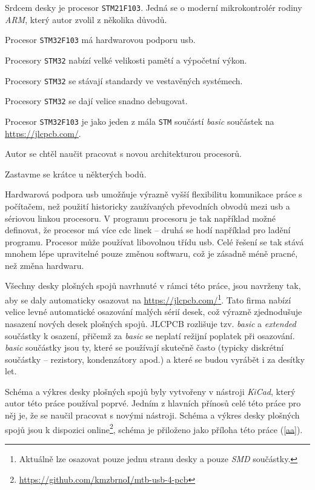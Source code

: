 Srdcem desky je procesor \texttt{STM21F103}. Jedná se o moderní mikrokontrolér
rodiny \textit{ARM}, který autor zvolil z několika důvodů.

\begin{compactenum}
\item Procesor \texttt{STM32F103} má hardwarovou podporu \gls{usb}.
\item Procesory \texttt{STM32} nabízí velké velikosti pamětí a výpočetní výkon.
\item Procesory \texttt{STM32} se stávají standardy ve vestavěných systémech.
\item Procesory \texttt{STM32} se dají velice snadno debugovat.
\item Procesor \texttt{STM32F103} je jako jeden z mála \texttt{STM} součástí
	\textit{basic} součástek na \url{https://jlcpcb.com/}.
\item Autor se chtěl naučit pracovat s novou architekturou procesorů.
\end{compactenum}

Zastavme se krátce u některých bodů.

Hardwarová podpora \gls{usb} umožňuje výrazně vyšší flexibilitu komunikace
práce s počítačem, než použití historicky zaužívaných převodních obvodů mezi
\gls{usb} a sériovou linkou procesoru. V programu procesoru je tak například
možné definovat, že procesor má více \gls{cdc} linek – druhá se hodí například
pro ladění programu. Procesor může používat libovolnou třídu \gls{usb}. Celé
řešení se tak stává mnohem lépe upravitelné pouze změnou softwaru, což je
zásadně méně pracné, než změna hardwaru.

Všechny desky plošných spojů navrhnuté v rámci této práce, jsou navrženy tak,
aby se daly automaticky osazovat na \url{https://jlcpcb.com/}\footnote{Aktuálně
lze osazovat pouze jednu stranu desky a pouze \textit{SMD} součástky.}. Tato
firma nabízí velice levné automatické osazování malých sérií desek, což výrazně
zjednodušuje nasazení nových desek plošných spojů. JLCPCB rozlišuje tzv.
\textit{basic} a \textit{extended} součástky k osazení, přičemž za
\textit{basic} se neplatí režijní poplatek při osazování. \textit{basic}
součástky jsou ty, které se používají skutečně často (typicky diskrétní
součástky – rezistory, kondenzátory apod.) a které se budou vyrábět i za
desítky let.

Schéma a výkres desky plošných spojů byly vytvořeny v nástroji \textit{KiCad},
který autor této práce používal poprvé. Jedním z hlavních přínosů celé této
práce pro něj je, že se naučil pracovat s novými nástroji. Schéma a výkres
desky plošných spojů jsou k dispozici
online\footnote{\url{https://github.com/kmzbrnoI/mtb-usb-4-pcb}}, schéma je
přiloženo jako příloha této práce (\ref{aa}).

